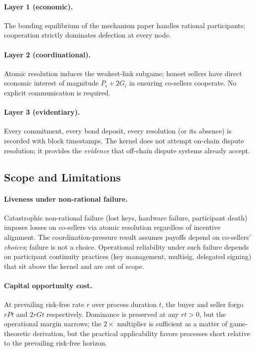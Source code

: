\documentclass[11pt,a4paper]{article}
\theoremstyle{definition}
\theoremstyle{remark}
\newcommand{\pay}{P}
\newcommand{\cumval}{G}
\begin{document}
\paragraph{Layer 1 (economic).}
The bonding equilibrium of the mechanism paper handles
rational participants; cooperation strictly dominates defection at
every node.

\paragraph{Layer 2 (coordinational).}
Atomic resolution induces the weakest-link subgame; honest sellers
have direct economic interest of magnitude $\pay_i + 2\cumval_i$ in
ensuring co-sellers cooperate. No explicit communication is required.

\paragraph{Layer 3 (evidentiary).}
Every commitment, every bond deposit, every resolution (or its
absence) is recorded with block timestamps. The kernel does not
attempt on-chain dispute resolution; it provides the \emph{evidence}
that off-chain dispute systems already accept.

\subsection{Scope and Limitations}

\paragraph{Liveness under non-rational failure.}
Catastrophic non-rational failure (lost keys, hardware failure,
participant death) imposes losses on co-sellers via atomic
resolution regardless of incentive alignment. The
coordination-pressure result assumes payoffs depend on co-sellers'
\emph{choices}; failure is not a choice. Operational reliability
under such failure depends on participant continuity practices (key
management, multisig, delegated signing) that sit above the kernel
and are out of scope.

\paragraph{Capital opportunity cost.}
At prevailing risk-free rate $r$ over process duration $t$, the
buyer and seller forgo $r\pay t$ and $2r\cumval t$ respectively.
Dominance is preserved at any $rt > 0$, but the operational margin
narrows; the $2\times$ multiplier is sufficient as a matter of
game-theoretic derivation, but the practical applicability favors
processes short relative to the prevailing risk-free horizon.
\end{document}
